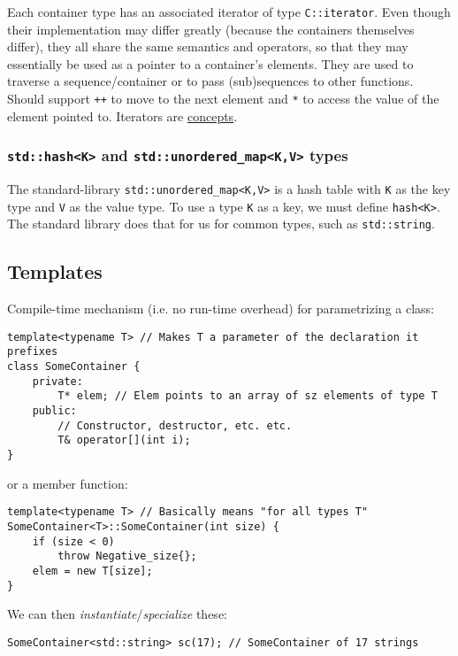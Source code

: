 \documentclass[8pt, table, xcdraw]{article}%
\begin{document}
Each container type has an associated iterator of type \lstinline{C::iterator}. Even though their implementation may differ greatly (because the containers themselves differ), they all share the same semantics and operators, so that they may essentially be used as a pointer to a container's elements. They are used to traverse a sequence/container or to pass (sub)sequences to other functions.  Should support \lstinline{++} to move to the next element and \lstinline{*} to access the value of the element pointed to. Iterators are \hyperref[concepts]{concepts}.

\subsubsection{\lstinline{std::hash<K>} and \lstinline{std::unordered_map<K,V>} types}

The standard-library \lstinline{std::unordered_map<K,V>} is a hash table with \lstinline{K} as the key type and \lstinline{V} as the value type. To use a type \lstinline{K} as a key, we must define \lstinline{hash<K>}. The standard library does that for us for common types, such as \lstinline{std::string}.

\subsection{Templates}

Compile-time mechanism (i.e. no run-time overhead) for parametrizing a class:

\begin{lstlisting}
template<typename T> // Makes T a parameter of the declaration it prefixes
class SomeContainer {
    private:
        T* elem; // Elem points to an array of sz elements of type T
    public:
        // Constructor, destructor, etc. etc.
        T& operator[](int i);
}
\end{lstlisting}

or a member function:

\begin{lstlisting}
template<typename T> // Basically means "for all types T"
SomeContainer<T>::SomeContainer(int size) {
    if (size < 0)
        throw Negative_size{};
    elem = new T[size];
}
\end{lstlisting}

We can then \textit{instantiate}/\textit{specialize} these:

\begin{lstlisting}
SomeContainer<std::string> sc(17); // SomeContainer of 17 strings
\end{lstlisting}
\end{document}
